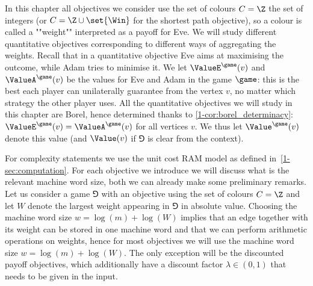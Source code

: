 In this chapter all objectives we consider use the set of colours $C = \Z$ the set of integers 
(or $C = \Z \cup \set{\Win}$ for the shortest path objective), 
so a colour is called a ""weight"" interpreted as a payoff for Eve.
We will study different quantitative objectives corresponding to different ways of aggregating the weights.
Recall that in a quantitative objective Eve aims at maximising the outcome, while Adam
tries to minimise it.
We let $\ValueE^\game(v)$ and $\ValueA^\game(v)$ be the values for Eve and Adam in the game $\game$: 
this is the best each player can unilaterally guarantee from the vertex $v$, no matter which strategy the other player uses.
All the quantitative objectives we will study in this chapter are Borel, hence determined thanks to \cref{1-cor:borel_determinacy}: 
$\ValueE^\game(v) = \ValueA^\game(v)$ for all vertices $v$. 
We thus let $\Value^\game(v)$ denote this value (and $\Value(v)$ if $\Game$ is clear from the context).

For complexity statements we use the unit cost RAM model as defined in~\cref{1-sec:computation}.
For each objective we introduce we will discuss what is the relevant machine word size, both we can already make some preliminary remarks.
Let us consider a game $\Game$ with an objective using the set of colours $C = \Z$
and let $W$ denote the largest weight appearing in $\Game$ in absolute value.
Choosing the machine word size $w = \log(m) + \log(W)$ implies that an edge together with its weight can be stored in one machine word and that we can perform arithmetic operations on weights, hence for most objectives we will use the machine word size $w = \log(m) + \log(W)$.
The only exception will be the discounted payoff objectives, which additionally have a discount factor $\lambda \in (0,1)$
that needs to be given in the input.


